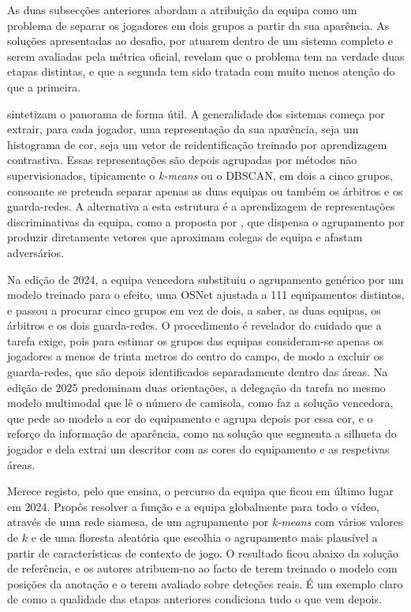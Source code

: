 As duas subsecções anteriores abordam a atribuição da equipa como um problema de separar os
jogadores em dois grupos a partir da sua aparência. As soluções apresentadas ao desafio, por
atuarem dentro de um sistema completo e serem avaliadas pela métrica oficial, revelam que o
problema tem na verdade duas etapas distintas, e que a segunda tem sido tratada com muito
menos atenção do que a primeira.

\citet{golovkin2025minimap} sintetizam o panorama de forma útil. A generalidade dos sistemas
começa por extrair, para cada jogador, uma representação da sua aparência, seja um histograma
de cor, seja um vetor de reidentificação treinado por aprendizagem contrastiva. Essas
representações são depois agrupadas por métodos não supervisionados, tipicamente o
\emph{k-means} ou o DBSCAN, em dois a cinco grupos, consoante se pretenda separar apenas as
duas equipas ou também os árbitros e os guarda-redes. A alternativa a esta estrutura é a
aprendizagem de representações discriminativas da equipa, como a proposta por
\citet{istasse2019associative}, que dispensa o agrupamento por produzir diretamente vetores
que aproximam colegas de equipa e afastam adversários.

Na edição de 2024, a equipa vencedora substituiu o agrupamento genérico por um modelo
treinado para o efeito, uma OSNet ajustada a 111 equipamentos distintos, e passou a procurar
cinco grupos em vez de dois, a saber, as duas equipas, os árbitros e os dois guarda-redes. O
procedimento é revelador do cuidado que a tarefa exige, pois para estimar os grupos das
equipas consideram-se apenas os jogadores a menos de trinta metros do centro do campo, de
modo a excluir os guarda-redes, que são depois identificados separadamente dentro das áreas.
Na edição de 2025 predominam duas orientações, a delegação da tarefa no mesmo modelo
multimodal que lê o número de camisola, como faz a solução vencedora, que pede ao modelo a
cor do equipamento e agrupa depois por essa cor, e o reforço da informação de aparência,
como na solução que segmenta a silhueta do jogador e dela extrai um descritor com as cores do
equipamento e as respetivas áreas.

Merece registo, pelo que ensina, o percurso da equipa que ficou em último lugar em 2024.
Propôs resolver a função e a equipa globalmente para todo o vídeo, através de uma rede
siamesa, de um agrupamento por \emph{k-means} com vários valores de $k$ e de uma floresta
aleatória que escolhia o agrupamento mais plausível a partir de características de contexto
de jogo. O resultado ficou abaixo da solução de referência, e os autores atribuem-no ao facto
de terem treinado o modelo com posições da anotação e o terem avaliado sobre deteções reais.
É um exemplo claro de como a qualidade das etapas anteriores condiciona tudo o que vem
depois.

